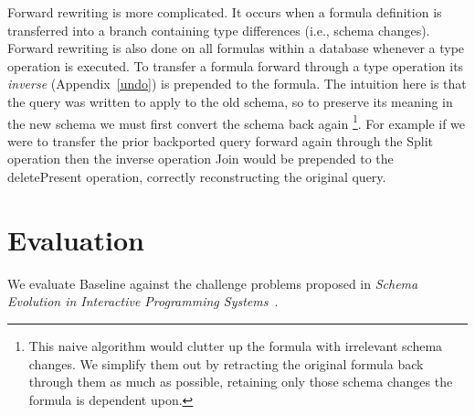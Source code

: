 \documentclass[english,submission]{programming}
\theoremstyle{definition}
\begin{document}
Forward rewriting is more complicated. It occurs when a formula definition is transferred into a branch containing type differences (i.e., schema changes). Forward rewriting is also done on all formulas within a database whenever a type operation is executed. To transfer a formula forward through a type operation its \textit{inverse} (Appendix~\ref{undo}) is prepended to the formula. The intuition here is that the query was written to apply to the old schema, so to preserve its meaning in the new schema we must first convert the schema back again
\footnote{This naive algorithm would clutter up the formula with irrelevant schema changes. We simplify them out by retracting the original formula back through them as much as possible, retaining only those schema changes the formula is dependent upon.}.
For example if we were to transfer the prior backported query forward again through the \textsf{Split} operation then the inverse operation \textsf{Join} would be prepended to the \textsf{deletePresent} operation, correctly reconstructing the original query.






\section{Evaluation}

We evaluate Baseline against the challenge problems proposed in
\textit{Schema Evolution in Interactive Programming Systems}~\cite{challenge-problems}.
\end{document}
